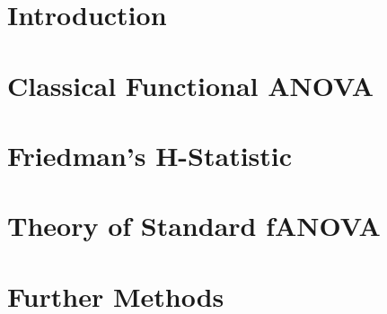 \documentclass[11pt,compress,t,n
otes=noshow, aspectratio=169, xcolor=table]{beamer}
\begin{document}


%
\section{Introduction}


\section{Classical Functional ANOVA}


\section{Friedman’s H-Statistic}


\section{Theory of Standard fANOVA}


\section{Further Methods}

\end{document}
